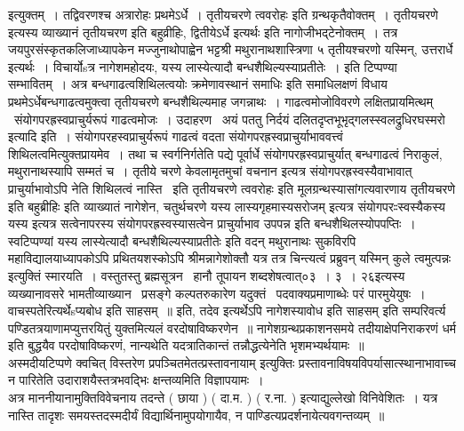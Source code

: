 \documentclass[11pt, openany]{book}
\begin{document}
\newpage

इत्युक्तम्~। तद्विवरणश्च {\qt अत्रारोहः प्रथमेऽर्धे~। तृतीयचरणे त्ववरोहः} इति ग्रन्थकृतैवोक्तम्~। {\qt तृतीयचरणे} इत्यस्य व्याख्यानं {\qt तृतीयचरण इति बहुव्रीहिः, द्वितीयेऽर्धे इत्यर्थः} इति नागोजीभद्टेनोक्तम्~। तत्र जयपुरसंस्कृतकलिजाध्यापकेन मज्जुनाथोपाह्वेन भट्टश्री मथुरानाथशास्त्रिणा ५ तृतीयश्चरणो यस्मिन्, उत्तरार्धे इत्यर्थः~। विचार्योsत्र नागेशमहोदयः, यस्य लास्येत्यादौ बन्धशैथिल्यस्याप्रतीतेः~। इति टिप्पण्या सम्भावितम्~। अत्र {\qt बन्धगाढत्वशिथिलत्वयोः क्रमेणावस्थानं समाधिः} इति समाधिलक्षणं विधाय प्रथमेऽर्धेबन्धगाढत्वमुक्त्वा तृतीयचरणे बन्धशैथिल्यमाह जगन्नाथः~। गाढत्वमोजोविवरणे लक्षितप्रायमित्थम् \textendash\ {\qt संयोगपरह्रस्वप्राचुर्यरूपं गाढत्वमोजः~। उदाहरण \textendash\ अयं पततु निर्दयं दलितदृप्तभूभृद्गलस्स्वलद्रुधिरघस्मरो इत्यादि} इति~। संयोगपरहस्वप्राचुर्यरूपं गाढत्वं वदता संयोगपरह्रस्वप्राचुर्याभाववत्त्वं शिथिलत्वमित्युक्तप्रायमेव~। तथा च स्वर्गनिर्गतेति पद्ये पूर्वार्धे संयोगपरह्रस्वप्राचुर्यात् बन्धगाढत्वं निराकुलं, मथुरानाथस्यापि सम्मतं च~। तृतीये चरणे केवलामृतमुचां वचनान इत्यत्र संयोगपरह्रस्वस्यैवाभावात् प्राचुर्याभावोऽपि नेति शिथिलत्वं नास्ति \textendash\ इति तृतीयचरणे त्ववरोहः इति मूलग्रन्थस्यासांगत्यवारणाय {\qt तृतीयचरणे इति बहुब्रीहिः} इति व्याख्यातं नागेशेन, चतुर्थचरणे {\qt यस्य लास्यगृहमास्यसरोजम्} इत्यत्र संयोगपरःःस्वस्यैकस्य {\qt यस्य} इत्यत्र सत्वेनापरस्य संयोगपरह्रस्वस्यासत्वेन प्राचुर्याभाव उपपन्न इति बन्धशैथिलस्योपपप्तिः~। स्वटिप्पण्यां {\qt यस्य लास्येत्यादौ बन्धशैथिल्यस्याप्रतीतेः} इति वदन् मथुरानाथः सुकविरपि महाविद्यालयाध्यापकोऽपि प्रथितयशस्कोऽपि श्रीमन्नागेशोक्तौ यत्र तत्र चिन्त्यत्वं प्रब्रुवन् {\qt यस्मिन् कुले त्वमुत्पन्नः} इत्युक्तिं स्मारयति~। वस्तुतस्तु ब्रह्मसूत्रन \textendash\ हानौ तूपायन शब्दशेषत्वात्०३~। ३~। २६इत्यस्य व्यख्यानावसरे भामतीव्याख्यान \textendash\ प्रसङ्गे कल्पतरुकारेण यदुक्तं \textendash\ {\qt पदवाक्यप्रमाणाब्धेः परं पारमुयेयुषः~। वाचस्पतेरित्यर्थेsप्यबोध इति साहसम्~॥ } इति, तदेव {\qt इत्यर्थेऽपि नागेशस्यावोध इति साहसम्} इति सम्परिवर्त्य पण्डितत्रयाणामप्युत्तरयितुं युक्तमित्यलं वरदोषाविष्करणेन~॥ नागेशग्रन्थप्रकाशनसमये तदीयाक्षेपनिराकरणं धर्म इति बुद्धयैव परदोषाविष्करणं, नान्यथेति यदत्रातिकान्तं तन्नौद्धत्येनेति भृशमभ्यर्थयामः~॥\\

अस्मदीयटिप्पणे क्वचित् विस्तरेण प्रपञ्चितमेतत्प्रस्तावनायाम् इत्युक्तिः प्रस्तावनाविषयविपर्यासात्स्थानाभावाच्च न पारितेति उदाराशयैस्तत्रभवद्भिः क्षन्तव्यमिति विज्ञापयामः~।\\

अत्र माननीयानामुक्तिविवेचनाय तदन्ते ( छाया ) ( दा.म. ) ( र.ना. ) इत्याद्युल्लेखो विनिवेशितः~। यत्र नास्ति तादृशः समयस्तदस्मदीर्यं विद्यार्थिनामुपयोगायैव, न पाण्डित्यप्रदर्शनायेत्यवगन्तव्यम्~॥\\
\end{document}
